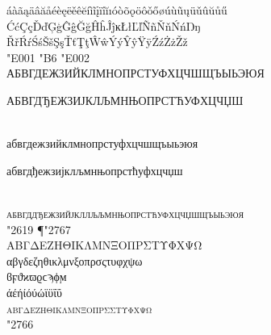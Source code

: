 \documentclass[pagesize,DIV14]{scrartcl}
\begin{document}
\begin{center}
{{%
áàãąäâăåéèęëěêĕíìĩįïîĭıóòõǫöôǒőøúùũųüǔûŭůű\\
ĆćÇçĎďĢģĜĝĞğĤĥĴĵĸŁłĽľÑñŇňŃńŊŋ\\
ŘřŔŕŚśŠšŞşŤťŢţŴŵÝýŶŷŸÿŹźŻżŽž}\\
{\Huge \char"E001 \char"B6 \char"E002}\\
АБВГДЕЖЗИЙКЛМНОПРСТУФХЦЧШЩЪЫЬЭЮЯ\\
\begin{serbian}{АБВГДЂЕЖЗИЈКЛЉМНЊОПРСТЋУФХЦЧЏШ}\end{serbian}\\
абвгдежзийклмнопрстуфхцчшщъыьэюя\\
\begin{serbian}{
абвгдђежзијклљмнњопрстћуфхцчџш}\end{serbian}\\
\textsc{абвгд{д}ђежзийјкл{л}љ{љ}мнњопрстћуфхцчџшщъыьэюя}\\
{\Huge \char"2619 {¶}\char"2767}\\
ΑΒΓΔΕΖΗΘΙΚΛΜΝΞΟΠΡΣΤΥΦΧΨΩ\\
αβγδεζηθικλμνξοπρσςτυφχψω\\
ϐϝϑϰϖϱϲϡϕϻ\\
άέήίόύώϊϋΐΰ\\
\textsc{αβγδεζηθικλμνξοπρσςτυφχψω}\\
{\Huge \char"2766}\\
}
\end{center}
\clearpage
\fontsize{16}{16}\itshape
\end{document}
